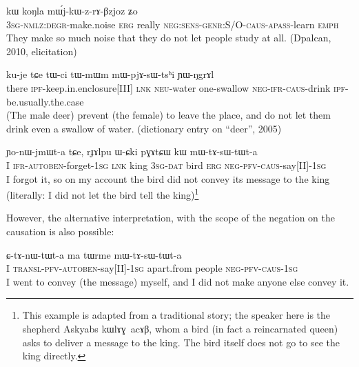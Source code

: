 \documentclass[oldfontcommands,oneside,a4paper,11pt]{article}
\newcommand{\ipa}[1]{{\phon \mbox{#1}}} %
\newcommand{\sg}{\textsc{sg}}
\newcommand{\wav}[1]{}%
\newcommand{\apass}{\textsc{apass}}
\newcommand{\pfv}{\textsc{pfv}}
\newcommand{\auto}{\textsc{autoben}}
\newcommand{\caus}{\textsc{caus}}
\newcommand{\lnk}{\textsc{lnk}}
\newcommand{\dat}{\textsc{dat}}
\newcommand{\degr}{\textsc{degr}}
\newcommand{\erg}{\textsc{erg}}
\newcommand{\emphat}{\textsc{emph}}
\newcommand{\evd}{\textsc{ifr}}
\newcommand{\genr}{\textsc{genr}}
\newcommand{\ipf}{\textsc{ipf}}
\newcommand{\negat}{\textsc{neg}}
\newcommand{\neu}{\textsc{neu}}
\newcommand{\nmlz}{\textsc{nmlz}}
\newcommand{\sens}{\textsc{sens}}
\newcommand{\transloc}{\textsc{transl}}
\begin{document}
  \begin{exe}
\ex
\gll  \ipa{ɯ-tɯ-ɣɤcraŋlaŋ} 	\ipa{kɯ} 	\ipa{koŋla} 	\ipa{mɯ́j-kɯ-z-rɤ-βzjoz} 	\ipa{ʑo} \\
3\sg{}-\nmlz{}:\degr{}-make.noise \erg{} really \negat{}:\sens{}-\genr{}:S/O-\caus{}-\apass{}-learn \emphat{} \\
  \glt  They make so much noise that they do not let people study at all. (Dpalcan, 2010, elicitation)
  \end{exe}   
  
   \begin{exe}
\ex
\gll   \ipa{nɯtɕu} 	\ipa{ku-je} 	\ipa{tɕe} 	\ipa{tɯ-ci} 	\ipa{tɯ-mɯm} 	\ipa{mɯ-pjɤ-sɯ-tsʰi} 	\ipa{ɲɯ-ŋgrɤl} \\
there \ipf{}-keep.in.enclosure[III] \lnk{} \neu{}-water one-swallow \negat{}-\evd{}-\caus{}-drink \ipf{}-be.usually.the.case \\
\glt (The male deer) prevent (the female) to leave the place, and do not let them drink even a swallow of water. (dictionary entry on ``deer'', 2005)
  \end{exe} 
  
\begin{exe}
\ex
\gll  \ipa{aʑo} 	\ipa{ɲo-nɯ-jmɯt-a} 	\ipa{tɕe,} 	\ipa{rɟɤlpu} 	\ipa{ɯ-ɕki} 	\ipa{pɣɤtɕɯ} 	\ipa{kɯ} 	\ipa{mɯ-tɤ-sɯ-tɯt-a}   \\
 I \textsc{ifr}-\auto{}-forget-1\sg{} \lnk{} king 3\sg{}-\dat{} bird \erg{} \negat{}-\pfv{}-\caus{}-say[II]-1\sg{} \\
  
  \glt  I forgot it, so  on my account  the bird did not convey its message to the king (literally: I did not let the bird tell the king)\footnote{This example is adapted from a traditional story; the speaker here is the shepherd Askyabs \ipa{kɯlɤɣ acɤβ}, whom a bird (in fact a reincarnated queen) asks to deliver a message to the king. The bird itself does not go to see the king directly.  } \wav{8_mWtAsWtWta2}
  \end{exe} 

  However, the alternative interpretation, with the scope of the negation on the causation is also possible:

  \begin{exe}
\ex
\gll \ipa{aʑo} 	\ipa{ɕ-tɤ-nɯ-tɯt-a} 	\ipa{ma} 	\ipa{tɯrme} 	\ipa{mɯ-tɤ-sɯ-tɯt-a} \\
I \transloc{}-\pfv{}-\auto{}-say[II]-1\sg{} apart.from people \negat{}-\pfv{}-\caus{}-1\sg{} \\
  \glt    I went to convey (the message) myself,  and I did not make anyone else convey it. \wav{8_mWtAsWtWta}
  \end{exe} 
 
\end{document}
